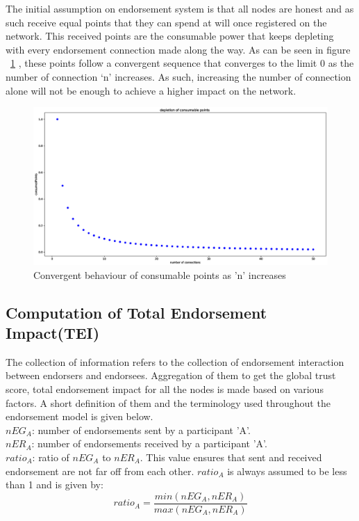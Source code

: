 The initial assumption on endorsement system is that all nodes are honest and
as such receive equal points that they can spend at will once registered on the
network. This received points are the consumable power that keeps depleting
with every endorsement connection made along the way. As can be seen in figure
~\ref{consumablePoint} , these points follow a convergent sequence that
converges to the limit 0 as the number of connection `n' increases. As such,
increasing the number of connection alone will not be enough to achieve a
higher impact on the network.
\begin{figure}
	\centering
	\includegraphics[width=1.0\textwidth]{Images/ConsumablePoints.eps}
	\caption{Convergent behaviour of consumable points as 'n' increases}
	\label{consumablePoint}
\end{figure}

\subsection{Computation of Total Endorsement Impact(TEI)} 
The collection of information refers to the collection of endorsement
interaction between endorsers and endorsees.  Aggregation of them to get the
global trust score, total endorsement impact for all the nodes is made based on
various factors. A short definition of them and the terminology used throughout
the endorsement model is given below. \\ 

\textit{$nEG_A$}: number of endorsements sent by a participant 'A'. \\
\textit{$nER_A$}: number of endorsements received by a participant 'A'. \\
\textit{$ratio_A$}: ratio of \textit{$nEG_A$} to \textit{$nER_A$}. This value
ensures that sent and received endorsement are not far off from  each other.
\textit{$ratio_A$} is always assumed to be less than 1 and is given by: 
\begin{equation}
	ratio_A = \frac{min(nEG_A,nER_A)}{max(nEG_A,nER_A)} 
\end{equation}

